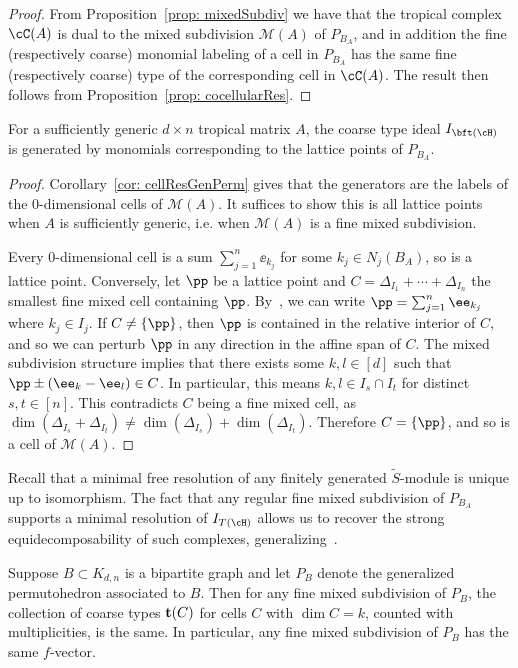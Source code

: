 \begin{proof}
From Proposition~\ref{prop: mixedSubdiv} we have that the tropical complex $\cC(A)$ is dual to the mixed subdivision ${\mathcal M}(A)$ of $P_{B_A}$, and in addition the fine (respectively coarse) monomial labeling of a cell in $P_{B_A}$ has the same fine (respectively coarse) type of the corresponding cell in $\cC(A)$.  The result then follows from Proposition~\ref{prop: cocellularRes}.
\end{proof}

\begin{cor}\label{cor: coarsemonomials}
For a sufficiently generic $d \times n$ tropical matrix $A$, the coarse type ideal $I_{\bft(\cH)}$ is generated by monomials corresponding to the lattice points of $P_{B_A}$.
\end{cor}
\begin{proof}
Corollary~\ref{cor: cellResGenPerm} gives that the generators are the labels of the 0-dimensional cells of ${\mathcal M}(A)$.
It suffices to show this is all lattice points when $A$ is sufficiently generic, i.e. when $\mathcal{M}(A)$ is a fine mixed subdivision.

Every 0-dimensional cell is a sum $\sum_{j=1}^n \ee_{k_j}$ for some $k_j \in N_j(B_A)$, so is a lattice point.
Conversely, let $\pp$ be a lattice point and $C = \Delta_{I_1} + \cdots + \Delta_{I_n}$ the smallest fine mixed cell containing $\pp$.
By~\cite[Lemma 14.12]{postnikov2009permutohedra}, we can write $\pp = \sum_{j=1}^n \ee_{k_j}$ where $k_j \in I_j$.
If $C \neq \{\pp\}$, then $\pp$ is contained in the relative interior of $C$, and so we can perturb $\pp$ in any direction in the affine span of $C$.
The mixed subdivision structure implies that there exists some $k, l \in [d]$ such that $\pp \pm (\ee_k - \ee_l) \in C$.
In particular, this means $k, l \in I_s \cap I_t$ for distinct $s, t \in [n]$.
This contradicts $C$ being a fine mixed cell, as $\dim(\Delta_{I_s} + \Delta_{I_t}) \neq \dim(\Delta_{I_s}) + \dim(\Delta_{I_t})$.
Therefore $C = \{\pp\}$, and so is a cell of $\mathcal{M}(A)$.
\end{proof}

Recall that a minimal free resolution of any finitely generated $\widetilde{S}$-module is unique up to isomorphism. The fact that any regular fine mixed subdivision of $P_{B_A}$ supports a minimal resolution of $I_{T(\cH)}$ allows us to recover the strong equidecomposability of such complexes, generalizing~\cite[Corollary 5]{dochtermann2012tropical}.

\begin{cor}
Suppose $B \subset K_{d,n}$ is a bipartite graph and let $P_{B}$ denote the generalized permutohedron associated to $B$.  Then for any fine mixed subdivision of $P_{B}$, the collection of coarse types ${\bf t}(C)$ for cells $C$ with $\dim C = k$, counted with multiplicities, is the same.
In particular, any fine mixed subdivision of $P_{B}$ has the same $f$-vector.
\end{cor}

